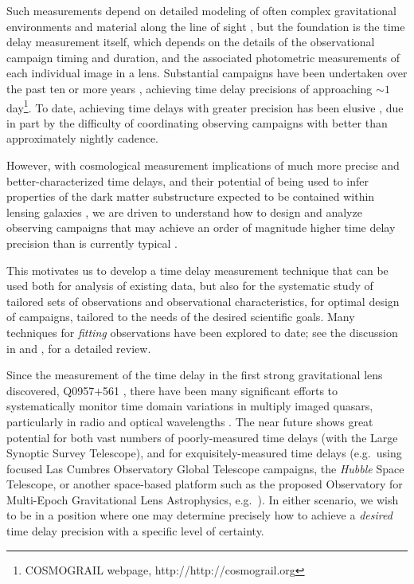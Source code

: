 \documentclass{emulateapj}
\begin{document}
Such measurements depend on detailed modeling of often complex
gravitational environments and material along the line of sight
\citep[e.g.][]{Greene2013a, Schneider2013a}, but the foundation is the
time delay measurement itself, which depends on the details of the
observational campaign timing and duration, and the associated
photometric measurements of each individual image in a
lens. Substantial campaigns have been undertaken over the past ten or
more years \citep[e.g.][]{Eigenbrod2005a, Tewes2013a}, achieving time
delay precisions of approaching $\sim1$\,day\footnote{COSMOGRAIL
  webpage, http://http://cosmograil.org}.  To date, achieving time
delays with greater precision has been elusive
\citep[e.g.][]{Oguri2007a}, due in part by the difficulty of
coordinating observing campaigns with better than approximately
nightly cadence.

However, with cosmological measurement implications of much more
precise and better-characterized time delays, and their potential of
being used to infer properties of the dark matter substructure
expected to be contained within lensing galaxies
\citep[e.g.][]{Primack2009a, Xu2009a}, we are driven to understand how
to design and analyze observing campaigns that may achieve an order of
magnitude higher time delay precision than is currently typical
\citep{Keeton2009a, Linder2011a}.

This motivates us to develop a time delay measurement technique that
can be used both for analysis of existing data, but also for the
systematic study of tailored sets of observations and observational
characteristics, for optimal design of campaigns, tailored to the
needs of the desired scientific goals. Many techniques for
\emph{fitting} observations have been explored to date; see the
discussion in \citet{Dobler2015a} and \citet{Liao2015a}, for a
detailed review.  

Since the measurement of the time delay in the first strong
gravitational lens discovered, Q0957$+$561 \citep{Walsh1979a,
  Press1999a}, there have been many significant efforts to
systematically monitor time domain variations in multiply imaged
quasars, particularly in radio \citep[e.g.][]{Fassnacht1999a} and
optical wavelengths \citep[c.f.\ compilations in][]{Oguri2007a,
  Mosquera2011a}.  The near future shows great potential for both vast
numbers of poorly-measured time delays (with the Large Synoptic Survey
Telescope), and for exquisitely-measured time delays (e.g.\ using
focused Las Cumbres Observatory Global Telescope campaigns, the
\emph{Hubble} Space Telescope, or another space-based platform such as
the proposed Observatory for Multi-Epoch Gravitational Lens
Astrophysics, e.g.\ \citealt{Moustakas2009a}). In either scenario, we
wish to be in a position where one may determine precisely how to
achieve a \emph{desired} time delay precision with a specific level of
certainty.
\end{document}
